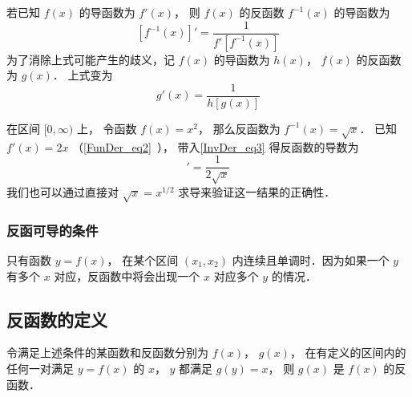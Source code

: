 

若已知 $f(x)$ 的导函数为 $f'(x)$， 则 $f(x)$ 的反函数 $f^{-1}(x)$ 的导函数为
\begin{equation}\label{InvDer_eq3}
[f^{-1}(x)]' = \frac{1}{f'[f^{-1}(x)]} 
\end{equation} 
为了消除上式可能产生的歧义，记 $f(x)$ 的导函数为 $h(x)$，  $f(x)$ 的反函数为 $g(x)$． 上式变为
 \begin{equation}
g'(x) = \frac{1}{h[g(x)]}
\end{equation}

\begin{example}{}
在区间 $[0, \infty)$ 上， 令函数 $f(x) = x^2$， 那么反函数为 $f^{-1}(x) = \sqrt{x}$． 已知 $f'(x) = 2x$ （\autoref{FunDer_eq2}~）， 带入\autoref{InvDer_eq3} 得反函数的导数为
\begin{equation}
[f^{-1}(x)]' = \frac{1}{2\sqrt{x}} 
\end{equation}
我们也可以通过直接对 $\sqrt{x} = x^{1/2}$ 求导来验证这一结果的正确性．
\end{example}

\subsubsection{反函可导的条件}
只有函数 $y = f(x)$， 在某个区间 $(x_1, x_2)$ 内连续且单调时．因为如果一个 $y$ 有多个 $x$ 对应，反函数中将会出现一个 $x$ 对应多个 $y$ 的情况．

\subsection{反函数的定义}
令满足上述条件的某函数和反函数分别为 $f(x)$，  $g(x)$， 在有定义的区间内的任何一对满足 $y = f(x)$ 的 $x$，  $y$ 都满足 $g(y) = x$， 则 $g(x)$ 是 $f(x)$ 的反函数．

